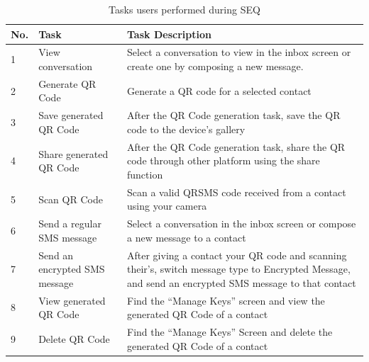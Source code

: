 \documentclass{report}
\begin{document}
\begin{table}[h]
	\begin{tabular}{|l|>{\raggedright}p{4cm}|p{6cm}|}
		\hline
		No.     & Task                                      & Task Description                                                                                                                                       \\ \hline
		1       & View conversation                         & Select a conversation to view in the inbox screen or create one by composing a new message.                                                            \\ \hline
		2       & Generate
		QR Code & Generate a QR code for a selected contact                                                                                                                                                          \\ \hline
		3       & Save generated QR Code                    & After the QR Code generation task, save the QR code to the device’s gallery                                                                            \\ \hline
		4       & Share generated QR Code                   & After the QR Code generation task, share the QR code through other platform using the share function                                                   \\ \hline
		5       & Scan QR Code                              & Scan a valid QRSMS code received from a contact using your camera                                                                                      \\ \hline
		6       & Send a regular SMS message                & Select a conversation in the inbox screen or compose a new message to a contact                                                                        \\ \hline
		
		7       & Send an encrypted SMS message             & After giving a contact your QR code and scanning their’s,  switch message type to Encrypted Message, and send an encrypted SMS message to that contact \\ \hline
		8       & View generated QR Code                    & Find the “Manage Keys” screen and view the generated QR Code of a contact                                                                              \\ \hline
		9       & Delete QR Code                            & Find the “Manage Keys” Screen and delete the generated QR Code of a contact                                                                            \\ \hline
	\end{tabular}
	\centering
	\caption{Tasks users performed during SEQ}
	\label{tasks_table}
\end{table}
\end{document}
